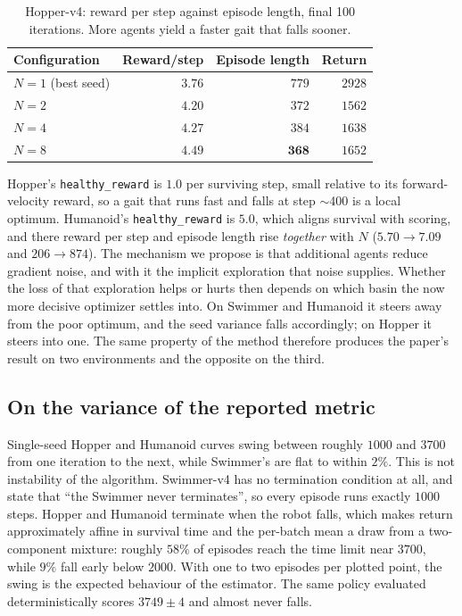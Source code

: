 \begin{table}[t]
  \centering
  \caption{Hopper-v4: reward per step against episode length, final 100
  iterations. More agents yield a faster gait that falls sooner.}
  \label{tab:hopper}
  \begin{tabular}{lrrr}
    \toprule
    Configuration & Reward/step & Episode length & Return \\
    \midrule
    $N=1$ (best seed) & $3.76$ & $779$ & $2928$ \\
    $N=2$ & $4.20$ & $372$ & $1562$ \\
    $N=4$ & $4.27$ & $384$ & $1638$ \\
    $N=8$ & $\mathbf{4.49}$ & $\mathbf{368}$ & $1652$ \\
    \bottomrule
  \end{tabular}
\end{table}

Hopper's \texttt{healthy\_reward} is $1.0$ per surviving step, small relative
to its forward-velocity reward, so a gait that runs fast and falls at step
$\sim$400 is a local optimum. Humanoid's \texttt{healthy\_reward} is $5.0$,
which aligns survival with scoring, and there reward per step and episode
length rise
\emph{together} with $N$ ($5.70 \to 7.09$ and $206 \to 874$). The mechanism we propose is that additional agents reduce gradient noise, and
with it the implicit exploration that noise supplies. Whether the loss of that
exploration helps or hurts then depends on which basin the now more decisive
optimizer settles into. On Swimmer and Humanoid it steers away from the poor
optimum, and the seed variance falls accordingly; on Hopper it steers into one.
The same property of the method therefore produces the paper's result on two
environments and the opposite on the third.

\subsection{On the variance of the reported metric}
\label{sec:variance}

Single-seed Hopper and Humanoid curves swing between roughly $1000$ and $3700$
from one iteration to the next, while Swimmer's are flat to within $2\%$. This
is not instability of the algorithm. Swimmer-v4 has no termination condition
at all, and \citet{gymnasium} state that ``the Swimmer never terminates'', so
every episode runs exactly $1000$ steps. Hopper and Humanoid terminate when
the robot falls, which makes return approximately affine in survival time and
the per-batch mean a draw from a two-component mixture: roughly $58\%$ of
episodes reach the time limit near $3700$, while $9\%$ fall early below
$2000$. With one to two episodes per plotted point, the swing is the expected
behaviour of the estimator. The same policy evaluated deterministically scores
$3749 \pm 4$ and almost never falls.

